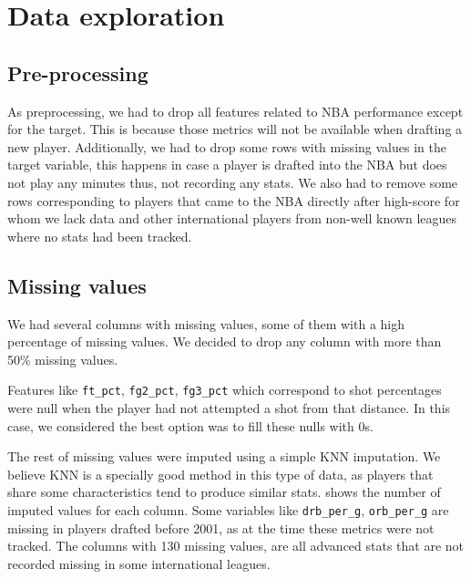 
\section{Data exploration}%
\label{sec:data-exploration}

\subsection{Pre-processing}%
\label{sub:pre-processing}

As preprocessing, we had to drop all features related to NBA performance except for the target. This is because those metrics will not be available when drafting a new player. Additionally, we had to drop some rows with missing values in the target variable, this happens in case a player is drafted into the NBA but does not play any minutes thus, not recording any stats. We also had to remove some rows corresponding to players that came to the NBA directly after high-score for whom we lack data and other international players from non-well known leagues where no stats had been tracked.

\subsection{Missing values}%
\label{sub:missing-values}


We had several columns with missing values, some of them with a high percentage of missing values. We decided to drop any column with more than 50\% missing values.

Features like \texttt{ft\_pct}, \texttt{fg2\_pct}, \texttt{fg3\_pct} which correspond to shot percentages were null when the player had not attempted a shot from that distance. In this case, we considered the best option was to fill these nulls with 0s.

The rest of missing values were imputed using a simple KNN imputation. We believe KNN is a specially good method in this type of data, as players that share some characteristics tend to produce similar stats.  shows the number of imputed
values for each column. Some variables like \texttt{drb\_per\_g}, \texttt{orb\_per\_g} are missing in players drafted before 2001, as at the time these metrics were not tracked. The columns with 130 missing values, are all advanced stats that are not recorded missing in some international leagues.

